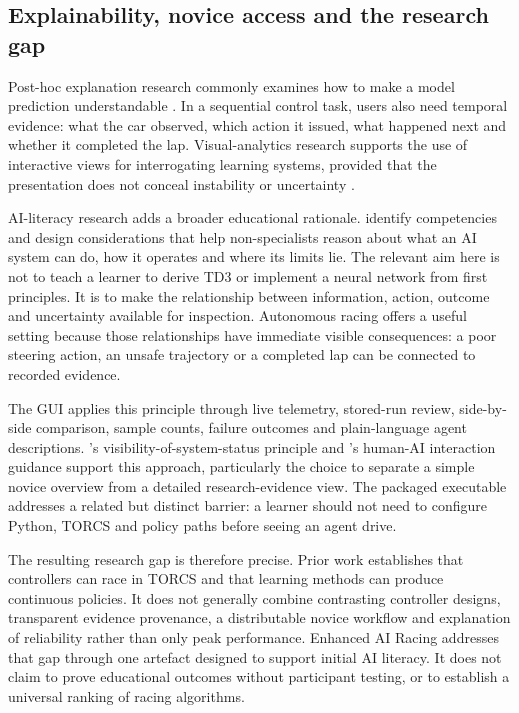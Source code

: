 \subsection{Explainability, novice access and the research gap}

Post-hoc explanation research commonly examines how to make a model prediction understandable \parencite{ribeiro2016,guidotti2019}. In a sequential control task, users also need temporal evidence: what the car observed, which action it issued, what happened next and whether it completed the lap. Visual-analytics research supports the use of interactive views for interrogating learning systems, provided that the presentation does not conceal instability or uncertainty \parencite{hohman2019}.

AI-literacy research adds a broader educational rationale. \textcite{long2020} identify competencies and design considerations that help non-specialists reason about what an AI system can do, how it operates and where its limits lie. The relevant aim here is not to teach a learner to derive TD3 or implement a neural network from first principles. It is to make the relationship between information, action, outcome and uncertainty available for inspection. Autonomous racing offers a useful setting because those relationships have immediate visible consequences: a poor steering action, an unsafe trajectory or a completed lap can be connected to recorded evidence.

The GUI applies this principle through live telemetry, stored-run review, side-by-side comparison, sample counts, failure outcomes and plain-language agent descriptions. \textcite{nielsen1994}'s visibility-of-system-status principle and \textcite{amershi2019}'s human-AI interaction guidance support this approach, particularly the choice to separate a simple novice overview from a detailed research-evidence view. The packaged executable addresses a related but distinct barrier: a learner should not need to configure Python, TORCS and policy paths before seeing an agent drive.

The resulting research gap is therefore precise. Prior work establishes that controllers can race in TORCS and that learning methods can produce continuous policies. It does not generally combine contrasting controller designs, transparent evidence provenance, a distributable novice workflow and explanation of reliability rather than only peak performance. Enhanced AI Racing addresses that gap through one artefact designed to support initial AI literacy. It does not claim to prove educational outcomes without participant testing, or to establish a universal ranking of racing algorithms.

